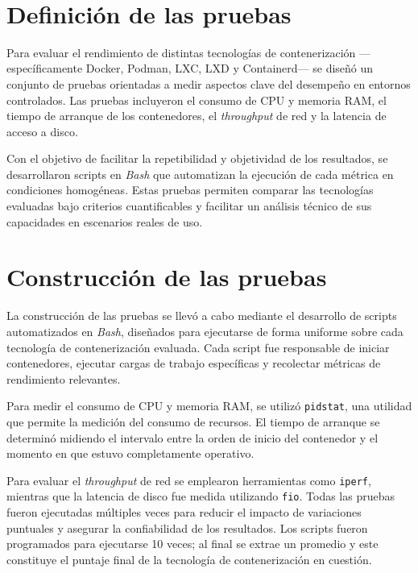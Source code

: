 \label{cap:benchmarking}

\mbox{}\\
\section{Definición de las pruebas}

Para evaluar el rendimiento de distintas tecnologías de contenerización —específicamente Docker, Podman, LXC, LXD y Containerd— se diseñó un conjunto de pruebas orientadas a medir aspectos clave del desempeño en entornos controlados. Las pruebas incluyeron el consumo de CPU y memoria RAM, el tiempo de arranque de los contenedores, el \textit{throughput} de red y la latencia de acceso a disco. 

Con el objetivo de facilitar la repetibilidad y objetividad de los resultados, se desarrollaron scripts en \textit{Bash} que automatizan la ejecución de cada métrica en condiciones homogéneas. Estas pruebas permiten comparar las tecnologías evaluadas bajo criterios cuantificables y facilitar un análisis técnico de sus capacidades en escenarios reales de uso.

\section{Construcción de las pruebas}

La construcción de las pruebas se llevó a cabo mediante el desarrollo de scripts automatizados en \textit{Bash}, diseñados para ejecutarse de forma uniforme sobre cada tecnología de contenerización evaluada. Cada script fue responsable de iniciar contenedores, ejecutar cargas de trabajo específicas y recolectar métricas de rendimiento relevantes.

Para medir el consumo de CPU y memoria RAM, se utilizó \texttt{pidstat}, una utilidad que permite la medición del consumo de recursos. El tiempo de arranque se determinó midiendo el intervalo entre la orden de inicio del contenedor y el momento en que estuvo completamente operativo. 

Para evaluar el \textit{throughput} de red se emplearon herramientas como \texttt{iperf}, mientras que la latencia de disco fue medida utilizando \texttt{fio}. Todas las pruebas fueron ejecutadas múltiples veces para reducir el impacto de variaciones puntuales y asegurar la confiabilidad de los resultados. Los scripts fueron programados para ejecutarse 10 veces; al final se extrae un promedio y este constituye el puntaje final de la tecnología de contenerización en cuestión.

